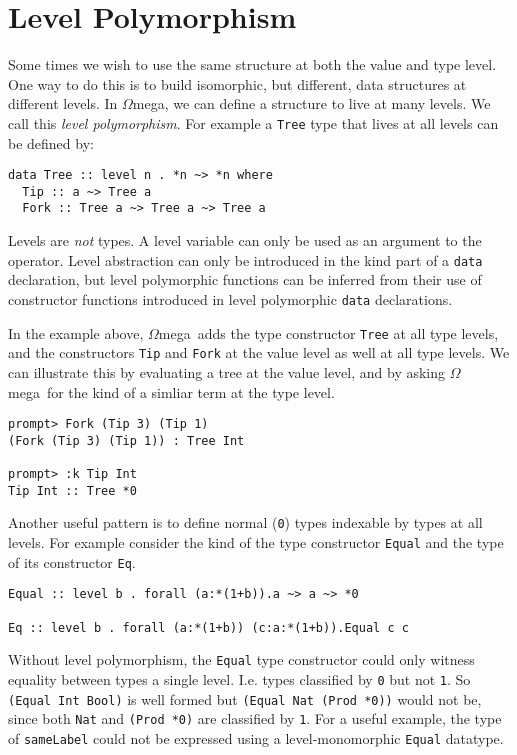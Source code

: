 \documentclass[11pt,twoside]{article}
\newcommand{\om}{$\Omega$mega}
\begin{document}
\section{Level Polymorphism}
Some times we wish to use the same structure at both the value and type level.
One way to do this is to build isomorphic, but different, data structures
at different levels. In \om, we can define a structure to live
at many levels. We call this {\it level polymorphism}. For example
a {\tt Tree} type that lives at all levels can be defined by:

\begin{verbatim}
data Tree :: level n . *n ~> *n where
  Tip :: a ~> Tree a
  Fork :: Tree a ~> Tree a ~> Tree a
\end{verbatim}
\noindent
Levels are {\it not} types. A level variable can only be used
as an argument to the {\tt *} operator. Level abstraction can only
be introduced in the kind part of a {\tt data} declaration, but level polymorphic
functions can be inferred from their use of constructor functions
introduced in level polymorphic {\tt data} declarations.

In the example above,
\om\ adds the type constructor {\tt Tree} at all type levels,
and the constructors {\tt Tip} and {\tt Fork} at the value level
as well at all type levels. We can illustrate this by evaluating
a tree at the value level, and by asking \om\ for the kind of
a simliar term at the type level.

\begin{verbatim}
prompt> Fork (Tip 3) (Tip 1)
(Fork (Tip 3) (Tip 1)) : Tree Int

prompt> :k Tip Int
Tip Int :: Tree *0 
\end{verbatim}

Another useful pattern is to define normal ({\tt *0}) types indexable
by types at all levels. For example consider the kind of the type constructor
{\tt Equal} and the type of its constructor {\tt Eq}.

\begin{verbatim}
Equal :: level b . forall (a:*(1+b)).a ~> a ~> *0

Eq :: level b . forall (a:*(1+b)) (c:a:*(1+b)).Equal c c
\end{verbatim}
Without level polymorphism, the {\tt Equal} type constructor could only
witness equality between types a single level. I.e. types classified by
{\tt *0} but not {\tt *1}. So {\tt (Equal Int Bool)} is well formed
but {\tt (Equal Nat (Prod *0))} would not be, since both {\tt Nat}
and {\tt (Prod *0)} are classified by {\tt *1}. For a useful
example, the type of {\tt sameLabel} could not be expressed
using a level-monomorphic {\tt Equal} datatype.
\end{document}
